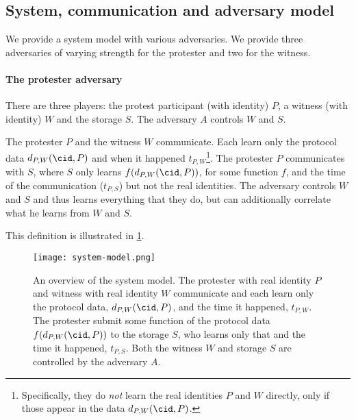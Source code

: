 \subsection{System, communication and adversary model}%
\label{adversary-model}

We provide a system model with various adversaries.
We provide three adversaries of varying strength for the protester and two for 
the witness.

\paragraph{The protester adversary}

There are three players: the protest participant (with identity) \(P\), a 
witness (with identity) \(W\) and the storage \(S\).
The adversary \(A\) controls \(W\) and \(S\).

\begin{definition}\label{base-protester-adversary}
  The protester \(P\) and the witness \(W\) communicate.
  Each learn only the protocol data \(d_{P,W}(\cid, P)\) and when it happened 
  \(t_{P,W}\)\footnote{%
    Specifically, they do \emph{not} learn the real identities \(P\) and \(W\) 
    directly, only if those appear in the data \(d_{P,W}(\cid, P)\).
  }.
  The protester \(P\) communicates with \(S\), where \(S\) only learns 
  \(f(d_{P,W}(\cid, P))\), for some function \(f\), and the time of the 
  communication (\(t_{P,S}\)) but not the real identities.
  The adversary controls \(W\) and \(S\) and thus learns everything that they 
  do, but can additionally correlate what he learns from \(W\) and \(S\).
\end{definition}

This definition is illustrated in \cref{fig:system-model}.

\begin{figure}
  \centering
  \texttt{[image: system-model.png]}
  \caption{\label{fig:system-model}%
    An overview of the system model.
    The protester with real identity \(P\) and witness with real identity \(W\) 
    communicate and each learn only the protocol data, \(d_{P,W}(\cid, P)\), 
    and the time it happened, \(t_{P,W}\).
    The protester submit some function of the protocol data \(f(d_{P,W}(\cid, 
      P))\) to the storage \(S\), who learns only that and the time it 
    happened, \(t_{P,S}\).
    Both the witness \(W\) and storage \(S\) are controlled by the adversary 
    \(A\).
  }
\end{figure}

